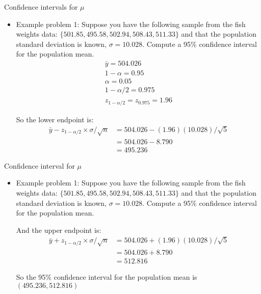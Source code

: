 \documentclass[xcolor=dvipsnames]{beamer}
\begin{document}
\begin{frame}{Confidence intervals for $\mu$}
	\begin{itemize}
		\item Example problem 1: Suppose you have the following sample from the fish weights data: $\{501.85, 495.58, 502.94, 508.43, 511.33 \}$ and that the population standard deviation is known, $\sigma = 10.028$. Compute a 95\% confidence interval for the population mean.
		\begin{gather*}
			\bar{y} = 504.026 \\
			1 - \alpha = 0.95 \\
			\alpha = 0.05 \\
			1 - \alpha / 2 = 0.975 \\
			z_{1 - \alpha / 2} = z_{0.975} = 1.96 
		\end{gather*}
		
		So the lower endpoint is:
		\begin{align*}
			\bar{y} - z_{1 - \alpha / 2} \times \sigma / \sqrt{n} &= 504.026 - (1.96)(10.028)/\sqrt{5} \\
			&= 504.026 - 8.790 \\
			&= 495.236
		\end{align*}
	\end{itemize}
\end{frame}

\begin{frame}{Confidence interval for $\mu$}
	\begin{itemize}
		\item Example problem 1: Suppose you have the following sample from the fish weights data: $\{501.85, 495.58, 502.94, 508.43, 511.33 \}$ and that the population standard deviation is known, $\sigma = 10.028$. Compute a 95\% confidence interval for the population mean.\\ \vspace{10pt}
		
		And the upper endpoint is:
		\begin{align*}
		\bar{y} + z_{1 - \alpha / 2} \times \sigma / \sqrt{n} &= 504.026 + (1.96)(10.028)/\sqrt{5} \\
		&= 504.026 + 8.790 \\
		&= 512.816
		\end{align*}
		
		So the 95\% confidence interval for the population mean is $(495.236, 512.816)$
	\end{itemize}
\end{frame}
\end{document}
